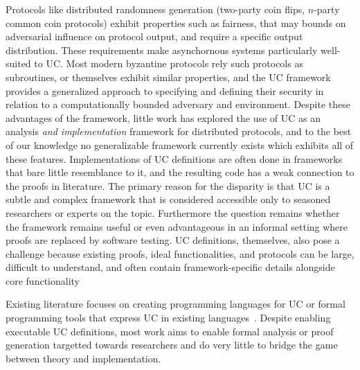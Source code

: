 Protocols like distributed randomness generation (two-party coin flips, $n$-party common coin protocols) exhibit properties such as fairness, that may bounds on adversarial influence on protocol output, and require a specific output distribution. 
These requirements make asynchornous systems particularly well-suited to UC.
Most modern byzantine protocols rely such protocols as subroutines, or themselves exhibit similar properties, and the UC framework provides a generalized approach to specifying and defining their security in relation to a computationally bounded adversary and environment.
Despite these advantages of the framework, little work has explored the use of UC as an analysis \emph{and implementation} framework for distributed protocols, and to the best of our knowledge no generalizable framework currently exists which exhibits all of these features.
Implementations of UC definitions are often done in frameworks that bare little resemblance to it, and the resulting code has a weak connection to the proofs in literature.
The primary reason for the disparity is that UC is a subtle and complex framework that is considered accessible only to seasoned researchers or experts on the topic.
Furthermore the question remains whether the framework remains useful or even advantageous in an informal setting where proofs are replaced by software testing. 
UC definitions, themselves, also pose a challenge because existing proofs, ideal functionalities, and protocols can be large, difficult to understand, and often contain framework-specific details alongside core functionality~\cite{badertscher2024bitcoin, badertscher2018ouroboros}

Existing literature focuses on creating programming languages for UC or formal programming tools that express UC in existing languages~\cite{canetti2019easyuc, liao2019ilc}.
Despite enabling executable UC definitions, most work aims to enable formal analysis or proof generation targetted towards researchers and do very little to bridge the game between theory and implementation.

